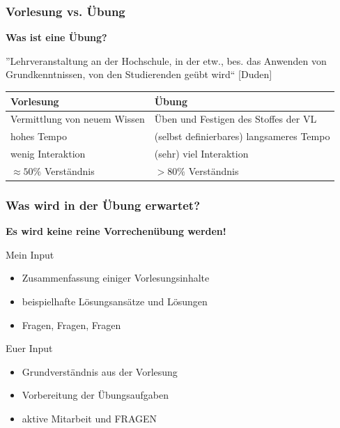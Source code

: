 \documentclass{beamer}
\begin{document}
	\begin{frame} \frametitle{Vorlesung vs. Übung}
		\centering
		\textbf{Was ist eine Übung?}
		
		''Lehrveranstaltung an der Hochschule, in der etw., bes. das Anwenden von Grundkenntnissen, von den Studierenden geübt wird`` [Duden]
		
		\pause
		
		\begin{tabularx}{\linewidth}{X|X}
			\hline
			\textbf{Vorlesung} & \textbf{Übung} \\ \hline \hline
			Vermittlung von neuem Wissen & Üben und Festigen des Stoffes der VL \\ \hline
			hohes Tempo & (selbst definierbares) langsameres Tempo \\ \hline
			wenig Interaktion & (sehr) viel Interaktion \\ \hline
			$\approx 50\%$ Verständnis & $>80\%$ Verständnis \\
			\hline
		\end{tabularx}
	\end{frame}

	\begin{frame} \frametitle{Was wird in der Übung erwartet?}
		\begin{center}
			\bfseries
			Es wird keine reine Vorrechenübung werden!
		\end{center}
		
		\pause
		
		\begin{block}{Mein Input}
			\begin{itemize}[leftmargin=2em, nolistsep]
				\item Zusammenfassung einiger Vorlesungsinhalte
				\item beispielhafte Lösungsansätze und Lösungen
				\item Fragen, Fragen, Fragen
			\end{itemize}
		\end{block}
	
		\pause
		\begin{block}{Euer Input}
			\begin{itemize}[leftmargin=2em, nolistsep]
				\item Grundverständnis aus der Vorlesung
				\item Vorbereitung der Übungsaufgaben
				\item aktive Mitarbeit und FRAGEN
			\end{itemize}
		\end{block}
	\end{frame}
\end{document}
